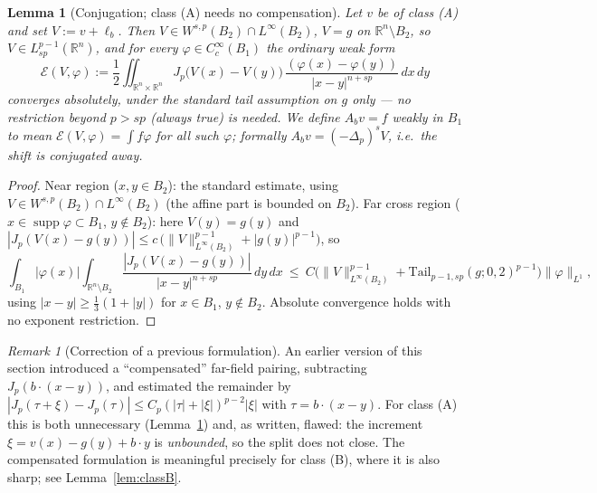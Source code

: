 \documentclass[11pt]{amsart}
\theoremstyle{plain}
\newtheorem{lemma}[theorem]{Lemma}
\theoremstyle{definition}
\theoremstyle{remark}
\newtheorem{remark}[theorem]{Remark}
\newcommand{\R}{\mathbb{R}}
\newcommand{\fpl}[1]{(-\Delta_p)^{s}#1}
\newcommand{\Tail}{\mathrm{Tail}_{p-1,sp}}
\begin{document}
\begin{lemma}[Conjugation; class \textnormal{(A)} needs no compensation]
\label{lem:conj}
Let $v$ be of class \textnormal{(A)} and set $V:=v+\ell_b$. Then $V\in
W^{s,p}(B_2)\cap L^\infty(B_2)$, $V=g$ on $\R^n\setminus B_2$, so
$V\in L^{p-1}_{sp}(\R^n)$, and for every $\varphi\in C_c^\infty(B_1)$ the
\emph{ordinary} weak form
\[
  \mathcal E(V,\varphi):=\frac12\iint_{\R^n\times\R^n}
   J_p\big(V(x)-V(y)\big)\,\frac{(\varphi(x)-\varphi(y))}{|x-y|^{n+sp}}
   \,dx\,dy
\]
converges absolutely, under the \emph{standard} tail assumption on $g$ only
--- no restriction beyond $p>sp$ \textnormal{(}always true\textnormal{)} is
needed. We \emph{define} $A_bv=f$ weakly in $B_1$ to mean
$\mathcal E(V,\varphi)=\int f\varphi$ for all such $\varphi$; formally
$A_bv=\fpl{V}$, i.e.\ the shift is conjugated away.
\end{lemma}
\begin{proof}
Near region ($x,y\in B_2$): the standard estimate, using
$V\in W^{s,p}(B_2)\cap L^\infty(B_2)$ (the affine part is bounded on $B_2$).
Far cross region ($x\in\operatorname{supp}\varphi\subset B_1$,
$y\notin B_2$): here $V(y)=g(y)$ and
$|J_p(V(x)-g(y))|\le c\,\big(\|V\|_{L^\infty(B_2)}^{p-1}+|g(y)|^{p-1}\big)$,
so
\[
  \int_{B_1}|\varphi(x)|\int_{\R^n\setminus B_2}
  \frac{|J_p(V(x)-g(y))|}{|x-y|^{n+sp}}\,dy\,dx
  \ \le\ C\Big(\|V\|_{L^\infty(B_2)}^{p-1}+\Tail(g;0,2)^{p-1}\Big)
  \|\varphi\|_{L^1},
\]
using $|x-y|\ge\frac13(1+|y|)$ for $x\in B_1$, $y\notin B_2$. Absolute
convergence holds with no exponent restriction.
\end{proof}

\begin{remark}[Correction of a previous formulation]\label{rem:correction}
An earlier version of this section introduced a ``compensated'' far-field
pairing, subtracting $J_p(b\cdot(x-y))$, and estimated the remainder by
$|J_p(\tau+\xi)-J_p(\tau)|\le C_p(|\tau|+|\xi|)^{p-2}|\xi|$ with
$\tau=b\cdot(x-y)$. For class \textnormal{(A)} this is both unnecessary
\textnormal{(}Lemma~\ref{lem:conj}\textnormal{)} and, as written, flawed: the
increment $\xi=v(x)-g(y)+b\cdot y$ is \emph{unbounded}, so the split does not
close. The compensated formulation is meaningful precisely for class
\textnormal{(B)}, where it is also sharp; see Lemma~\ref{lem:classB}.
\end{remark}
\end{document}
